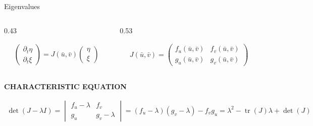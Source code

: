 \begin{frame}{Eigenvalues}

\vspace{-0.48cm}

\begin{columns}[c,onlytextwidth]

  \begin{column}{0.43\textwidth}
    \centering

    \vspace{-0.24cm}

    {\color{HydraWhite}\fontsize{9.4}{12}\selectfont
    \begin{align*}
      \begin{pmatrix}
        \partial_t\eta
        \\
        \partial_t\xi
      \end{pmatrix}
      =
      J(\bar u,\bar v)
      \begin{pmatrix}
        \eta
        \\
        \xi
      \end{pmatrix}
    \end{align*}
    }
  \end{column}

  \begin{column}{0.53\textwidth}
    \centering


    \vspace{-0.24cm}

    {\color{HydraWhite}\fontsize{8.8}{11.2}\selectfont
    \begin{align*}
      J(\bar u,\bar v)
      =
      \begin{pmatrix}
        f_u(\bar u,\bar v) & f_v(\bar u,\bar v)
        \\
        g_u(\bar u,\bar v) & g_v(\bar u,\bar v)
      \end{pmatrix}
    \end{align*}
    }
  \end{column}

\end{columns}

\vspace{-0.38cm}

\begin{center}
  {\color{HydraGold}\bfseries\fontsize{7.8}{9.4}\selectfont
    CHARACTERISTIC EQUATION
  \par}

  \vspace{-0.24cm}

  {\color{HydraWhite}\fontsize{8.8}{11.2}\selectfont
  \begin{align*}
    \det\!\left(J-\lambda I\right)=
    \begin{vmatrix}
      f_u-\lambda & f_v
      \\
      g_u & g_v-\lambda
    \end{vmatrix}
    =
    (f_u-\lambda)(g_v-\lambda)-f_vg_u=
    \lambda^2-\operatorname{tr}(J)\lambda+\det(J)
  \end{align*}
  }
\end{center}
 

\end{frame}
